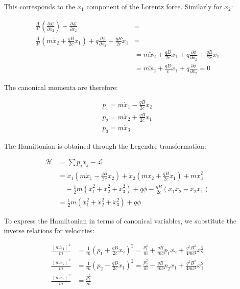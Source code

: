 \documentclass[italian]{HKNdocument}
\begin{document}
This corresponds to the $x_1$ component of the Lorentz force. Similarly for $x_2$:

\begin{align}
\frac{\mathrm{d}}{\mathrm{d} t}(\frac{\partial \mathcal{L}}{\partial \dot{x}_{2}})-\frac{\partial \mathcal{L}}{\partial x_{2}} &= \\
\frac{\mathrm{d}}{\mathrm{d} t}(m \dot{x}_{2}+\frac{q B}{2 c} x_{1})+q \frac{\partial \phi}{\partial x_{2}}+\frac{q B}{2 c} \dot{x}_{1} &= \\
&= m \ddot{x}_{2}+\frac{q B}{2 c} \dot{x}_{1}+q \frac{\partial \phi}{\partial x_{2}}+\frac{q B}{2 c} \dot{x}_{1}\\
&= m \ddot{x}_{2}+\frac{q B}{c} \dot{x}_{1}+q \frac{\partial \phi}{\partial x_{2}}=0
\end{align}

The canonical momenta are therefore:

\[
\begin{array}{r}
p_{1}=m \dot{x}_{1}-\frac{q B}{2 c} x_{2} \\
p_{2}=m \dot{x}_{2}+\frac{q B}{2 c} x_{1}  \\
p_{3}=m \dot{x}_{3}
\end{array}
\]

The Hamiltonian is obtained through the Legendre transformation:

\begin{align}
\mathcal{H} &= \sum p_{j} \dot{x}_{j}-\mathcal{L}\\
&= \dot{x}_{1}(m \dot{x}_{1}-\frac{q B}{2 c} x_{2})+\dot{x}_{2}(m \dot{x}_{2}+\frac{q B}{2 c} x_{1})+m \dot{x}_{3}^{2}\\
&\quad -\frac{1}{2} m(\dot{x}_{1}^{2}+\dot{x}_{2}^{2}+\dot{x}_{3}^{2})+q \phi-\frac{q B}{2 c}(x_{1} \dot{x}_{2}-x_{2} \dot{x}_{1})\\
&= \frac{1}{2} m(\dot{x}_{1}^{2}+\dot{x}_{2}^{2}+\dot{x}_{3}^{2})+q \phi
\end{align}


To express the Hamiltonian in terms of canonical variables, we substitute the inverse relations for velocities:

\begin{align}
\frac{(m\dot{x}_{1})^{2}}{m} &= \frac{1}{m}(p_{1}+\frac{q B}{2 c} x_{2})^{2}=\frac{p_{1}^{2}}{m}+\frac{q B}{m c} p_{1}x_{2}+\frac{q^{2}B^{2}}{4mc^{2}}x_{2}^{2} \\
\frac{(m\dot{x}_{2})^{2}}{m} &= \frac{1}{m}(p_{2}-\frac{q B}{2 c} x_{1})^{2}=\frac{p_{2}^{2}}{m}-\frac{q B}{m c}p_{2}x_{1}+\frac{q^{2}B^{2}}{4mc^{2}}x_{1}^{2}  \\
\frac{(m\dot{x}_{3})^{2}}{m} &= \frac{p_{3}^{2}}{m}
\end{align}
\end{document}
